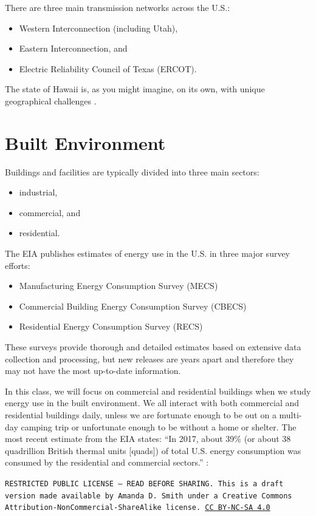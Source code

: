 \documentclass[10pt]{article}
\begin{document}
There are three main transmission networks across the U.S.: \begin{itemize}
\item Western Interconnection (including Utah),
\item Eastern Interconnection, and
\item Electric Reliability Council of Texas (ERCOT).
\end{itemize}

The state of Hawaii is, as you might imagine, on its own, with unique geographical challenges  \cite{noauthor_undated-wl}.

\section{Built Environment}

Buildings and facilities are typically divided into three main sectors: 

\begin{itemize}
    \item industrial, 
    \item commercial, and
    \item residential.
\end{itemize}

The EIA publishes estimates of energy use in the U.S. in three major survey efforts:

\begin{itemize}
    \item Manufacturing Energy Consumption Survey (MECS) \cite{noauthor_undated-dy}
    \item Commercial Building Energy Consumption Survey (CBECS) \cite{noauthor_undated-va}
    \item Residential Energy Consumption Survey (RECS) \cite{noauthor_undated-wv}
\end{itemize}

These surveys provide thorough and detailed estimates based on extensive data collection and processing, but new releases are years apart and therefore they may not have the most up-to-date information.

In this class, we will focus on commercial and residential buildings when we study energy use in the built environment. We all interact with both commercial and residential buildings daily, unless we are fortunate enough to be out on a multi-day camping trip or unfortunate enough to be without a home or shelter.
The most recent estimate from the EIA states: ``In 2017, about 39\% (or about 38 quadrillion British thermal units [quads]) of total U.S. energy consumption was consumed by the residential and commercial sectors.'' \cite{noauthor_undated-ow}:



\bigskip

\noindent
\texttt{\footnotesize RESTRICTED PUBLIC LICENSE --- READ BEFORE SHARING. This is a draft version made available by Amanda D. Smith under a Creative Commons Attribution-NonCommercial-ShareAlike license. 
\href{https://creativecommons.org/licenses/by-nc-sa/4.0/}{CC BY-NC-SA 4.0}}

\newpage
\printbibliography
\end{document}
